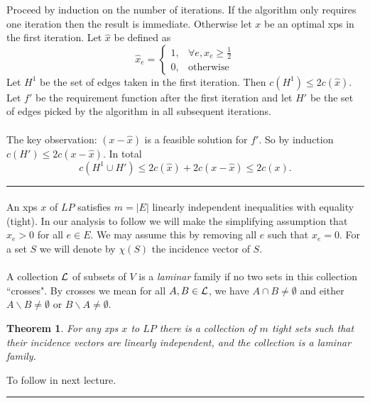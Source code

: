 \documentclass[letterpaper,12pt,oneside,onecolumn]{article}
\newenvironment{proof}{{\bf Proof:  }}{\hfill\rule{2mm}{2mm}}
\newtheorem{theorem}[fact]{Theorem}
\begin{document}
\begin{proof}
Proceed by induction on the number of iterations. If the algorithm only requires one iteration then the result is immediate. Otherwise let $x$ be an optimal xps in the first iteration. Let $\hat{x}$ be defined as
$$ \hat{x}_e = \begin{cases} 1, &\forall e, x_e \geq \frac{1}{2} \\
0, &\text{otherwise}\end{cases}$$
Let $H^1$ be the set of edges taken in the first iteration. Then $c(H^1) \leq 2c(\hat{x})$. Let $f'$ be the requirement function after the first iteration and let $H'$ be the set of edges picked by the algorithm in all subsequent iterations. 
\paragraph{}
The key observation: $(x-\hat{x})$ is a feasible solution for $f'$. So by induction $c(H') \leq 2c(x-\hat{x})$. In total
$$c(H^1 \cup H') \leq 2c(\hat{x}) + 2c(x-\hat{x}) \leq 2c(x).$$
\end{proof}
\paragraph{}
An xps $x$ of $LP$ satisfies $m = |E|$ linearly independent inequalities with equality (tight). In our analysis to follow we will make the simplifying assumption that $x_e > 0$ for all $e\in E$. We may assume this by removing all $e$ such that $x_e = 0$. For a set $S$ we will denote by $\chi(S)$ the incidence vector of $S$.
\paragraph{}
A collection $\mathcal{L}$ of subsets of $V$ is a \textit{laminar} family if no two sets in this collection ``crosses". By crosses we mean for all $A, B \in \mathcal{L}$, we have $A\cap B \neq \emptyset$ and either $A\backslash B \neq \emptyset$ or $B\backslash A \neq \emptyset$.
\begin{theorem}
For any xps $x$ to $LP$ there is a collection of $m$ tight sets such that their incidence vectors are linearly independent, and the collection is a laminar family.
\end{theorem}
\begin{proof}
To follow in next lecture.
\end{proof}
\end{document}
